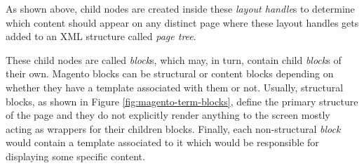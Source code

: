 As shown above, child nodes are created inside these \textit{layout handle}s to determine which content should appear on any distinct page where these layout handles gets added to an XML structure called \textit{page tree}.

These child nodes are called \textit{block}s, which may, in turn, contain child \textit{block}s of their own. 
Magento blocks can be structural or content blocks depending on whether they have a template associated with them or not.
Usually, structural blocks, as shown in Figure \ref{fig:magento-term-blocks}, define the primary structure of the page and they do not explicitly render anything to the screen mostly acting as wrappers for their children blocks.
Finally, each non-structural \textit{block} would contain a template associated to it which would be responsible for displaying some specific content.

